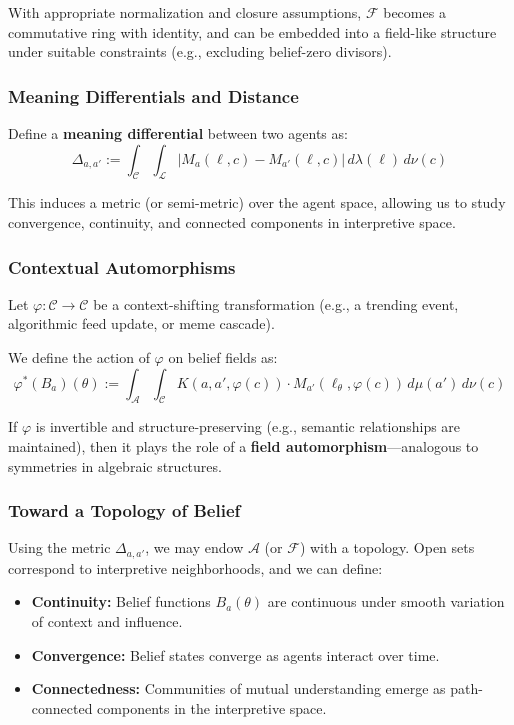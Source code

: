 With appropriate normalization and closure assumptions, \( \mathcal{F} \) becomes a commutative ring with identity, and can be embedded into a field-like structure under suitable constraints (e.g., excluding belief-zero divisors).

\subsubsection{Meaning Differentials and Distance}

Define a \textbf{meaning differential} between two agents as:
\[
\Delta_{a, a'} := \int_{\mathcal{C}} \int_{\mathcal{L}} \left| M_a(\ell, c) - M_{a'}(\ell, c) \right| \, d\lambda(\ell) \, d\nu(c)
\]

This induces a metric (or semi-metric) over the agent space, allowing us to study convergence, continuity, and connected components in interpretive space.

\subsubsection{Contextual Automorphisms}

Let \( \varphi: \mathcal{C} \to \mathcal{C} \) be a context-shifting transformation (e.g., a trending event, algorithmic feed update, or meme cascade).

We define the action of \( \varphi \) on belief fields as:
\[
\varphi^*(B_a)(\theta) := \int_{\mathcal{A}} \int_{\mathcal{C}} K(a, a', \varphi(c)) \cdot M_{a'}(\ell_\theta, \varphi(c)) \, d\mu(a') \, d\nu(c)
\]

If \( \varphi \) is invertible and structure-preserving (e.g., semantic relationships are maintained), then it plays the role of a \textbf{field automorphism}—analogous to symmetries in algebraic structures.

\subsubsection{Toward a Topology of Belief}

Using the metric \( \Delta_{a,a'} \), we may endow \( \mathcal{A} \) (or \( \mathcal{F} \)) with a topology. Open sets correspond to interpretive neighborhoods, and we can define:

\begin{itemize}
    \item \textbf{Continuity:} Belief functions \( B_a(\theta) \) are continuous under smooth variation of context and influence.
    \item \textbf{Convergence:} Belief states converge as agents interact over time.
    \item \textbf{Connectedness:} Communities of mutual understanding emerge as path-connected components in the interpretive space.
\end{itemize}

